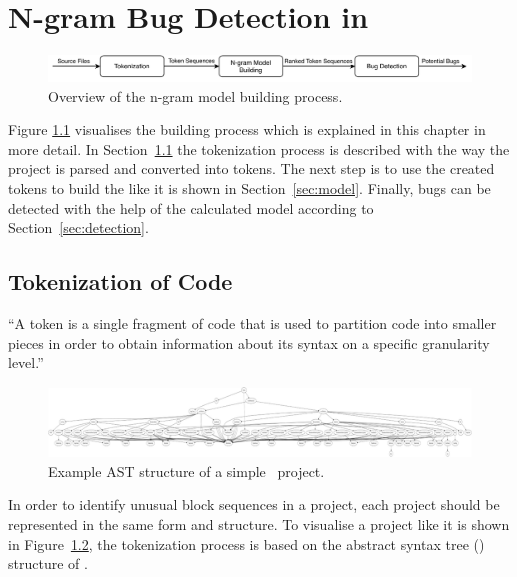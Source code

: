 \chapter{N-gram Bug Detection in \scratch{}}\label{chap:methods}

\begin{figure}[hbtp]
\centering
\includegraphics[scale=0.75]{images/Overview.pdf}
\caption{Overview of the n-gram model building process.}
\label{fig:overview}
\end{figure}

Figure \ref{fig:overview} visualises the \ngram{} building process which is explained in this chapter in more detail. In Section~\ref{sec:tokenization} the tokenization process is described with the way the \scratch{} project is parsed and converted into tokens. The next step is to use the created tokens to build the \ngram{} like it is shown in Section~\ref{sec:model}. Finally, bugs can be detected with the help of the calculated model according to Section~\ref{sec:detection}.

\section{Tokenization of \scratch{} Code}\label{sec:tokenization}

\begin{definition}[Token]\label{def:token}
    ``A token is a single fragment of \scratch{} code that is used to partition code into smaller pieces in order to obtain information about its syntax on a specific granularity level.''
\end{definition}

\begin{figure}[hbtp]
\centering
\includegraphics[scale=0.20]{images/AST_example(3).png}
\caption{Example AST structure of a simple \scratch\ project.}
\label{fig:ast}
\end{figure}

In order to identify unusual block sequences in a \scratch{} project, each project should be represented in the same form and structure. To visualise a \scratch{} project like it is shown in Figure~\ref{fig:ast}, the tokenization process is based on the abstract syntax tree (\AST{}) structure of \litterbox{}. 

